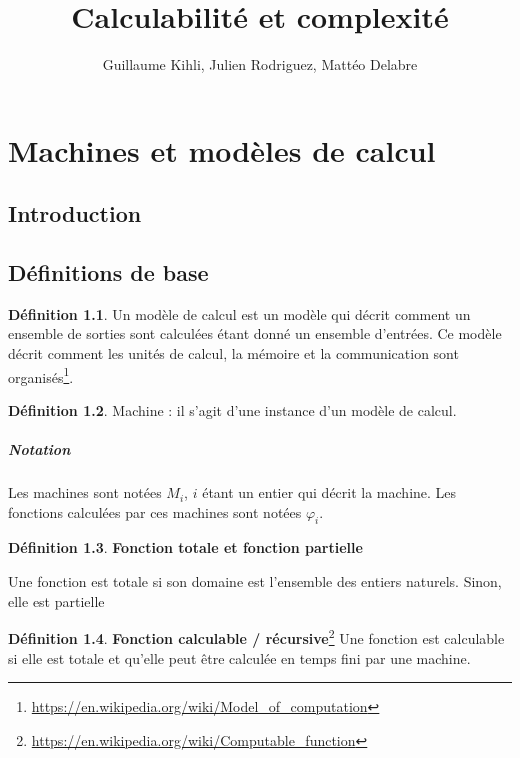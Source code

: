 \documentclass{book}
\title{Calculabilité et complexité}
\author{Guillaume Kihli, Julien Rodriguez, Mattéo Delabre}
\theoremstyle{definition}
\newtheorem{definition}{Définition}
\numberwithin{lemma}{subsection}
\numberwithin{theorem}{subsection}
\numberwithin{definition}{subsection}
\numberwithin{proposition}{subsection}
\numberwithin{corollary}{subsection}
\numberwithin{property}{subsection}
\numberwithin{example}{subsection}
\numberwithin{heuristique}{subsection}
\numberwithin{scenario}{subsection}
\begin{document}
\maketitle
\tableofcontents


\chapter{Machines et modèles de calcul}
    \section*{Introduction}
    \section{Définitions de base}
        \begin{definition}
            Un modèle de calcul est un modèle qui décrit comment un ensemble de sorties sont calculées étant donné un ensemble d'entrées. Ce modèle décrit comment les unités de calcul, la mémoire et la communication sont organisés\footnote{\url{https://en.wikipedia.org/wiki/Model\_of\_computation}}.
        \end{definition}
        
        \begin{definition}
            Machine : il s'agit d'une instance d'un modèle de calcul.
        \end{definition}
        
        \paragraph{Notation} Les machines sont notées $M_i$, $i$ étant un entier qui décrit la machine. Les fonctions calculées par ces machines sont notées $\varphi_i$.
        
        \begin{definition}\textbf{Fonction totale et fonction partielle}
            \par Une fonction est totale si son domaine est l'ensemble des entiers naturels. Sinon, elle est partielle
        \end{definition}
        
        \begin{definition}\label{def:fonc_rec}\textbf{Fonction calculable / récursive}\footnote{\url{https://en.wikipedia.org/wiki/Computable\_function}}
            Une fonction est calculable si elle est totale et qu'elle peut être calculée en temps fini par une machine.
        \end{definition}
        
\end{document}
